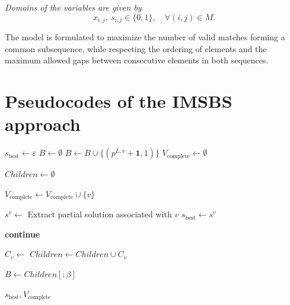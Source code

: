 \documentclass[runningheads]{llncs}
\begin{document}
\textit{Domains of the variables are given by}
\[
x_{i,j},\ s_{i,j} \in \{0,1\}, \quad \forall (i,j) \in M.
\]

The model is formulated to maximize the number of valid matches forming a common subsequence,
while respecting the ordering of elements and the maximum allowed gaps between consecutive
elements in both sequences.

\section{Pseudocodes of the IMSBS approach}

\begin{algorithm}[H]
	\caption{Rooted Beam Search}
	\label{alg:bs}
	\begin{algorithmic}[1]
		
		
		\State $s_{\text{best}} \gets \varepsilon$
		\State $B \gets \emptyset$ 
		 
		   \State $B \gets B \cup \{ (p^{L,v}+\textbf{1}, 1) \}$
		\EndFor
		\State $V_{\text{complete}} \gets \emptyset$
		
		\State $Children \gets \emptyset$
		
		\State $V_{\text{complete}} \gets V_{\text{complete}} \cup \{v\}$
		
		\State $s^v \gets$ Extract partial solution associated with $v$
		\State $s_{\text{best}} \gets s^v$
		\EndIf
		
		\State \textbf{continue}
		\EndIf
		
		\State $C_v \gets$ 
		\State $Children \gets Children \cup C_v$
		\EndFor
		
		\State {} 
		\State $B \gets Children[ \colon \beta]$
		\EndWhile
		
		\State \Return $s_{\text{best}}, V_{\text{complete}}$
		\EndFunction
	\end{algorithmic}
\end{algorithm}
\end{document}
